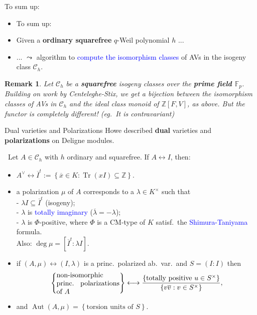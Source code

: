 \documentclass[usenames,dvipsnames]{beamer}
\def\Z{\mathbb{Z}}
\def\F{\mathbb{F}}
\DeclareMathOperator{\Aut}{Aut}
\DeclareMathOperator{\Tr}{Tr}
\newcommand{\cC}{{\mathcal C}}
\newcommand{\set}[1]{\left\lbrace#1\right\rbrace }
\newcommand{\blue}[1]{\textcolor{blue}{#1}}
\newtheorem{remark}[df]{Remark}
\begin{document}
\begin{frame}{ To sum up: }
    \begin{itemize}
    \item To sum up:
\pause
    \item Given a {\bf ordinary squarefree} $q$-Weil polynomial $h$ ...
\pause
    \item ... $\leadsto$ algorithm to \blue{compute the isomorphism classes} of AVs in the isogeny class $\cC_h$.
\end{itemize}
\pause    
    \begin{remark}
        Let $\cC_h$ be a {\bf squarefree} isogeny classes over the {\bf prime field $\F_p$}.
        Building on work by Centeleghe-Stix, we get a bijection between the isomorphism classes of AVs in $\cC_h$ and the ideal class monoid of $\Z[F,V]$, as above.
        But the functor is completely different! (eg.~It is contravariant)
    \end{remark}
\end{frame}


\begin{frame}{Dual varieties and Polarizations }
    Howe described \textbf{dual} varieties and \textbf{polarizations} on Deligne modules.
\pause
    \begin{theorem}\
    Let $A\in \cC_h$ with $h$ ordinary and squarefree. If $A\leftrightarrow I$, then:
    \begin{itemize}
\pause
    \item $A^\vee \leftrightarrow \overline{I}^t:=\set{ \overline{x} \in K : \Tr(xI)\subseteq \Z}$.
\pause
    \item a polarization $\mu$ of $A$ corresponds to a $\lambda\in K^\times$ such that\\
    - $\lambda I \subseteq \overline{I}^t$ (isogeny);\\
    - $\lambda$ is \blue{totally imaginary} ($\overline \lambda = -\lambda$);\\
    - $\lambda$ is $\Phi$-positive, where $\Phi$ is a CM-type of $K$ satisf.~the \blue{Shimura-Taniyama} formula.\\ 
\pause
    Also: $\deg \mu= [\overline{I}^t : \lambda I]$.
\pause
    \item if $(A,\mu) \leftrightarrow (I,\lambda)$ is a princ.~polarized ab.~var.~and $S=(I:I)$ then
    \vspace{-0.7em}
    \[\set{\parbox[p]{9em}{non-isomorphic princ. polarizations of $A$}} \longleftrightarrow \dfrac{\set{\text{totally positive }u\in S^\times }}{\set{v\overline{v}: v\in S^\times}},\]
    \vspace{-1.5em}
\pause
    \item  and $\Aut(A,\mu) = \set{\text{torsion units of $S$}}$.
    \end{itemize}
    \end{theorem}
\end{frame}
\end{document}
